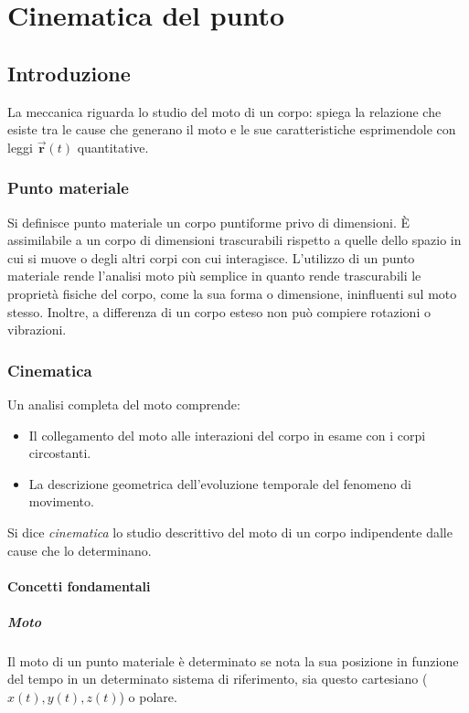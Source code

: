 \documentclass[class=book, crop=false, oneside, 12pt]{standalone}
\begin{document}
\chapter{Cinematica del punto}

\section{Introduzione}
La meccanica riguarda lo studio del moto di un corpo: spiega la relazione che esiste tra le cause che generano il moto e le sue caratteristiche esprimendole con leggi \(\overrightarrow{\mathbf{r}}(t)\) quantitative.
  \subsection{Punto materiale}
  Si definisce punto materiale un corpo puntiforme privo di dimensioni.
  \`E assimilabile a un corpo di dimensioni trascurabili rispetto a quelle dello spazio in cui si muove o degli altri corpi con cui interagisce.
  L'utilizzo di un punto materiale rende l'analisi moto pi\`u semplice in quanto rende trascurabili le propriet\`a fisiche del corpo, come la sua forma o dimensione, ininfluenti sul moto stesso.
    Inoltre, a differenza di un corpo esteso non pu\`o compiere rotazioni o vibrazioni.
  \subsection{Cinematica}
  Un analisi completa del moto comprende:
    \begin{itemize}
      \item Il collegamento del moto alle interazioni del corpo in esame con i corpi circostanti.
      \item La descrizione geometrica dell'evoluzione temporale del fenomeno di movimento.
    \end{itemize}
  Si dice \emph{cinematica} lo studio descrittivo del moto di un corpo indipendente dalle cause che lo determinano.
    \subsubsection{Concetti fondamentali}
      \paragraph{Moto}
      Il moto di un punto materiale \`e determinato se nota la sua posizione in funzione del tempo in un determinato sistema di riferimento, sia questo cartesiano (\(x(t), y(t), z(t)\)) o polare.
\end{document}

